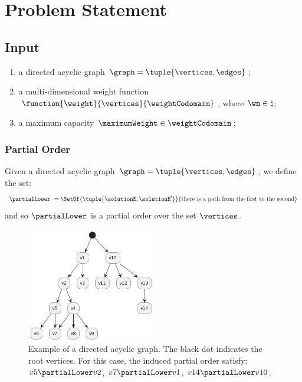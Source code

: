 \section{Problem Statement}

\subsection{Input}

\begin{enumerate}
    \item a directed acyclic graph $\graph = \tuple{\vertices,\edges}$;
    \item a multi-dimensional weight function $\function{\weight}{\vertices}{\weightCodomain}$, where $\wn \in \natural$;
    \item a maximum capacity $\maximumWeight \in \weightCodomain$;
\end{enumerate}

\subsubsection{Partial Order}

\begin{defn}
    Given a directed acyclic graph $\graph = \tuple{\vertices,\edges}$, we define the set:
    \begin{equation}
        \partialLower
        \ =
        \SetOf
            {\tuple{\solutionE, \solutionE'}}
            {\mbox{there is a path from the first to the second}}
    \end{equation}
    and so $\partialLower$ is a partial order over the set $\vertices$.
\end{defn}

\begin{figure}[ht!]
    \centering
    \includegraphics[width=0.5\textwidth]{images/directed acyclic graph.png}
    \caption{Example of a directed acyclic graph. The black dot indicates the root vertices. For this case, the induced partial order satisfy: $v5 \partialLower v2$, $v7 \partialLower v1$, $v14 \partialLower v10$.}
\end{figure}

